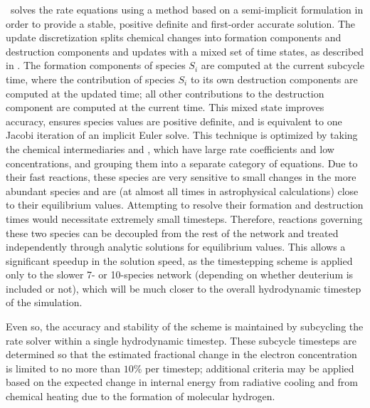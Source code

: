 \enzo\ solves the rate equations using a method based on a semi-implicit
formulation in order to provide a stable, positive definite and first-order
accurate solution.  The update discretization splits chemical changes into
formation components and destruction components and updates with a mixed set of
time states, as described in \citet{anninos97}.  The formation components of
species $S_i$ are computed at the current subcycle time, where the contribution
of species $S_i$ to its own destruction components are computed at the updated
time; all other contributions to the destruction component are computed at the
current time.  This mixed state improves accuracy, ensures species values
are positive definite, and is equivalent to one Jacobi iteration of an implicit
Euler solve.  This technique is optimized by taking the chemical intermediaries
\Hm and \HHp, which have large rate coefficients and low concentrations, and
grouping them into a separate category of equations.  Due to their fast
reactions, these species are very sensitive to small changes in the more
abundant species and are (at almost all times in astrophysical calculations) close to
their equilibrium values.  Attempting to resolve their formation and destruction
times would necessitate extremely small timesteps.
Therefore, reactions governing these two
species can be decoupled from the rest of the network and treated independently
through analytic solutions for equilibrium values.  This allows a significant speedup
in the solution speed, as the timestepping scheme is applied only to the slower 7- or
10-species network (depending on whether deuterium is included or not), which
will be much closer to the overall hydrodynamic timestep of the simulation.

Even so, the accuracy and stability of the scheme is maintained by subcycling
the rate solver within a single hydrodynamic timestep.  These subcycle
timesteps are determined so that the estimated fractional change in the
electron concentration is limited to no more than $10\%$ per timestep;
additional criteria may be applied based on the expected change in
internal energy from radiative
cooling and from  chemical heating due to the formation of molecular hydrogen.

